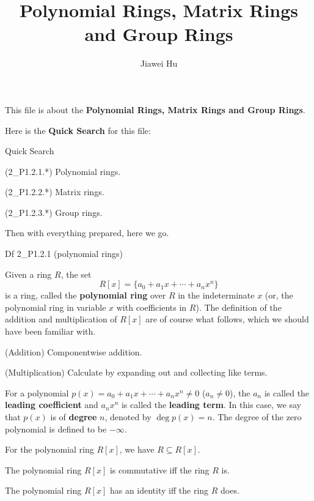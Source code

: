 \documentclass{article}
\title{\LARGE \textbf{Polynomial Rings, Matrix Rings and Group Rings}}
\author{\large Jiawei Hu}
\begin{document}
\maketitle

This file is about the \textbf{Polynomial Rings, Matrix Rings and Group Rings}. 

Here is the \textbf{Quick Search} for this file:
\begin{Th}{Quick Search}
    \begin{compactdesc}
        \item (2\_P1.2.1.*) Polynomial rings.
        \item (2\_P1.2.2.*) Matrix rings.
        \item (2\_P1.2.3.*) Group rings.
    \end{compactdesc}
\end{Th}

Then with everything prepared, here we go. 

\begin{Df}{Df 2\_P1.2.1 (polynomial rings)}
    \begin{compactenum}
        \item Given a ring $R$, the set 
        $$ R[x] = \{a_0 + a_1 x + \cdots + a_n x^n\} $$
        \textcolor{Th}{is a ring,} called the \textbf{polynomial ring} over $R$ in the indeterminate $x$ (or, the polynomial ring in variable $x$ with coefficients in $R$). The definition of the addition and multiplication of $R[x]$ are of course what follows, which we should have been familiar with.
        \begin{compactenum}
            \item (Addition) Componentwise addition.
            \item (Multiplication) Calculate by expanding out and collecting like terms.
        \end{compactenum}
        For a polynomial $p(x) = a_0 + a_1 x + \cdots + a_n x^n\neq 0$ ($a_n\neq 0$), the $a_n$ is called the \textbf{leading coefficient} and $a_nx^n$ is called the \textbf{leading term}. In this case, we say that $p(x)$ is of \textbf{degree} $n$, denoted by $\deg p(x) = n$. The degree of the zero polynomial is defined to be $-\infty$. 
        \item \textcolor{Th}{For the polynomial ring $R[x]$, we have $R\subseteq R[x]$.}
        \item \textcolor{Th}{The polynomial ring $R[x]$ is commutative iff the ring $R$ is.}
        \item \textcolor{Th}{The polynomial ring $R[x]$ has an identity iff the ring $R$ does.}
    \end{compactenum}
\end{Df}
\end{document}
